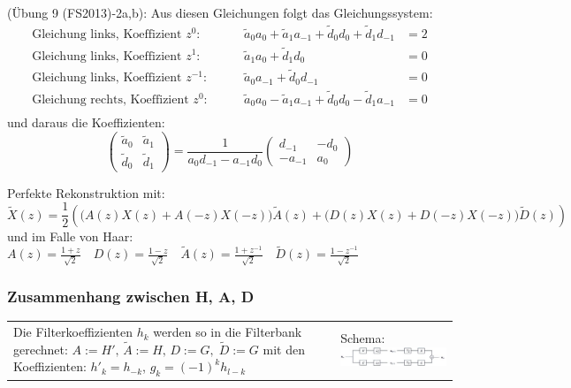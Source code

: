 (Übung 9 (FS2013)-2a,b): Aus diesen Gleichungen folgt das Gleichungssystem:
\begin{align*}
  \text{Gleichung links, Koeffizient } z^0: \qquad & \tilde a_0 a_0 + \tilde a_1 a_{-1} + \tilde d_0 d_0 + \tilde d_1 d_{-1} &= 2 \\
  \text{Gleichung links, Koeffizient } z^1: \qquad & \tilde a_1 a_0 + \tilde d_1 d_0 &= 0 \\
  \text{Gleichung links, Koeffizient } z^{-1}: \qquad & \tilde a_0 a_{-1} + \tilde d_0 d_{-1} &= 0 \\
  \text{Gleichung rechts, Koeffizient } z^{0}: \qquad & \tilde a_0 a_0 - \tilde a_1 a_{-1} + \tilde d_0 d_0 - \tilde d_1 a_{-1} &= 0 \\
\end{align*}
und daraus die Koeffizienten:
\[
  \begin{pmatrix}
    \tilde a_0 & \tilde a_1\\
    \tilde d_0 & \tilde d_1
  \end{pmatrix}
  = \frac{1}{a_0 d_{-1} - a_{-1} d_0} \begin{pmatrix}
    d_{-1} & -d_0 \\
    -a_{-1} & a_0
  \end{pmatrix}
\]

Perfekte Rekonstruktion mit:
\[
\tilde{X}(z) = \frac12 \left( \big(A(z) X(z) + A(-z)X(-z)\big) \tilde{A}(z) + \big(D(z)X(z) + D(-z)X(-z)\big) \tilde{D}(z) \right)
\]
und im Falle von Haar: 
$A(z) = \frac{1+z}{\sqrt{2}} \quad 
D(z) = \frac{1-z}{\sqrt{2}} \quad 
\tilde{A}(z) = \frac{1+z^{-1}}{\sqrt{2}} \quad 
\tilde{D}(z) = \frac{1-z^{-1}}{\sqrt{2}}$
\\
\subsubsection{Zusammenhang zwischen H, A, D }
\begin{tabularx}{\textwidth}{X | p{9cm}}
Die Filterkoeffizienten $h_k$ werden so in die Filterbank gerechnet:\newline
$A := H', \, \tilde A := H,\, D := G, \; \tilde D := G$
mit den Koeffizienten: $h'_k = h_{-k}$, $g_k = (-1)^k h_{l-k}$
& Schema: \newline
  \includegraphics[width=9cm]{./content/MsaFilterbank.png}\\
\end{tabularx}

